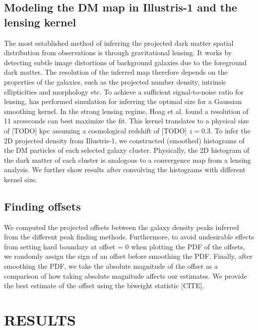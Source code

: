 \subsection{Modeling the DM map in Illustris-1 and the lensing kernel}
The most established method of inferring the projected dark matter spatial 
distribution from observations is through gravitational lensing.
It works by detecting subtle image distortions of background galaxies due to
the foreground dark matter. The resolution of the inferred map therefore 
depends on the properties of the galaxies, such as the projected number density, 
intrinsic ellipticities and morphology etc.
To achieve a sufficient signal-to-noise ratio for lensing, 
\citealt{Hoag2016}  has performed simulation for inferring the optimal size
for a Gaussian smoothing kernel. 
In the strong lensing regime, Hoag et al. found a resolution of 11 arcseconds
can best maximize the fit. This kernel translates to a physical size of [TODO]
kpc assuming a cosmological redshift of [TODO] $z = 0.3$.
To infer the 2D projected density from Illustris-1, 
we constructed (smoothed) histograms of the DM
particles of each selected galaxy cluster. 
Physically, the 2D histogram of the dark matter of each cluster 
is analogous to a convergence map from a lensing analysis. 
We further show results after convolving the histograms with different kernel
size.   




\subsection{Finding offsets} 
We computed the projected offsets between the galaxy density peaks inferred
from the different peak finding methods. 
Furthermore, to avoid undesirable effects from setting hard boundary at offset
= 0 when plotting the PDF of the offsets, we randomly assign the sign of an
offset before smoothing the PDF. Finally, after smoothing the PDF, we take the
absolute magnitude of the offset as a comparison of how taking absolute
magnitude affects our estimates. We provide the best estimate of the offset
using the biweight statistic [CITE].







\section{RESULTS} 
\label{sec:results}


